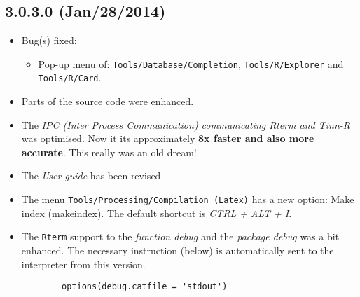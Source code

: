 \subsection*{3.0.3.0 (Jan/28/2014)}
\begin{itemize}
  \item Bug(s) fixed:
    \begin{itemize}
      \item Pop-up menu of: \texttt{Tools/Database/Completion},
       \texttt{Tools/R/Explorer} and \texttt{Tools/R/Card}.
    \end{itemize}
  \item Parts of the source code were enhanced.
  \item The \textit{IPC (Inter Process Communication) communicating Rterm and Tinn-R} was optimised.
   Now it its approximately \textbf{8x faster and also more accurate}. This really was an old dream!
  \item The \textit{User guide} has been revised.
  \item The menu \texttt{Tools/Processing/Compilation (Latex)} has a new option: Make index (makeindex).
   The default shortcut is \textit{CTRL + ALT + I}.
  \item The \texttt{Rterm} support to the \textit{function debug} and the \textit{package debug} was a bit enhanced.
   The necessary instruction (below) is automatically sent to the \RR{} interpreter from this version.

    \begin{footnotesize}
      \begin{verbatim}
        options(debug.catfile = 'stdout')
      \end{verbatim}
    \end{footnotesize}
\end{itemize}


